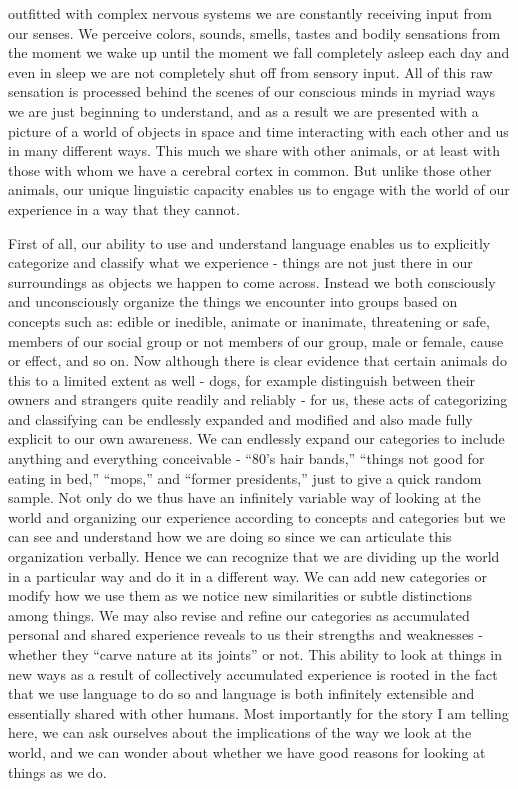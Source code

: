 \documentclass[justified]{tufte-book}
\begin{document}
 outfitted with complex nervous systems we are constantly receiving input from our senses. We perceive colors, sounds, smells, tastes and bodily sensations from the moment we wake up until the moment we fall completely asleep each day and even in sleep we are not completely shut off from sensory input. All of this raw sensation is processed behind the scenes of our conscious minds in myriad ways we are just beginning to understand, and as a result we are presented with a picture of a world of objects in space and time interacting with each other and us in many different ways. This much we share with other animals, or at least with those with whom we have a cerebral cortex in common. But unlike those other animals, our unique linguistic capacity enables us to engage with the world of our experience in a way that they cannot.

First of all, our ability to use and understand language enables us to explicitly categorize and classify what we experience - things are not just there in our surroundings as objects we happen to come across. Instead we both consciously and unconsciously organize the things we encounter into groups based on concepts such as: edible or inedible, animate or inanimate, threatening or safe, members of our social group or not members of our group, male or female, cause or effect, and so on. Now although there is clear evidence that certain animals do this to a limited extent as well - dogs, for example distinguish between their owners and strangers quite readily and reliably - for us, these acts of categorizing and classifying can be endlessly expanded and modified and also made fully explicit to our own awareness. We can endlessly expand our categories to include anything and everything conceivable - ``80's hair bands,'' ``things not good for eating in bed,'' ``mops,'' and ``former presidents,'' just to give a quick random sample. Not only do we thus have an infinitely variable way of looking at the world and organizing our experience according to concepts and categories but we can see and understand how we are doing so since we can articulate this organization verbally. Hence we can recognize that we are dividing up the world in a particular way and do it in a different way. We can add new categories or modify how we use them as we notice new similarities or subtle distinctions among things. We may also revise and refine our categories as accumulated personal and shared experience reveals to us their strengths and weaknesses - whether they ``carve nature at its joints'' or not. This ability to look at things in new ways as a result of collectively accumulated experience is rooted in the fact that we use language to do so and language is both infinitely extensible and essentially shared with other humans. Most importantly for the story I am telling here, we can ask ourselves about the implications of the way we look at the world, and we can wonder about whether we have good reasons for looking at things as we do.
\end{document}
